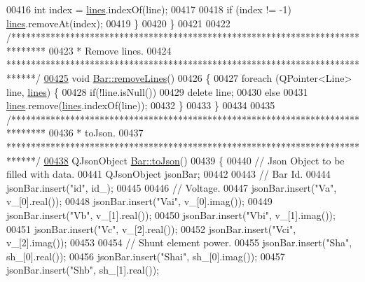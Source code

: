 \begin{DoxyCode}
00416     \textcolor{keywordtype}{int} index = \hyperlink{class_bar_a5aabf1f4ac22e20e9cb702a3a7e08eea}{lines}.indexOf(line);
00417 
00418     \textcolor{keywordflow}{if} (index != -1) \hyperlink{class_bar_a5aabf1f4ac22e20e9cb702a3a7e08eea}{lines}.removeAt(index);
00419   \}
00420 \}
00421 
00422 \textcolor{comment}{/*******************************************************************************}
00423 \textcolor{comment}{ * Remove lines.}
00424 \textcolor{comment}{ ******************************************************************************/}
\hypertarget{bar_8cpp_source_l00425}{}\hyperlink{group___models_ga4ea1a2074cb45968d80d6add571884a4}{00425} \textcolor{keywordtype}{void} \hyperlink{group___models_ga4ea1a2074cb45968d80d6add571884a4}{Bar::removeLines}()
00426 \{
00427   \textcolor{keywordflow}{foreach} (QPointer<Line> line, \hyperlink{class_bar_a5aabf1f4ac22e20e9cb702a3a7e08eea}{lines}) \{
00428     \textcolor{keywordflow}{if}(!line.isNull())
00429       \textcolor{keyword}{delete} line;
00430     \textcolor{keywordflow}{else}
00431       \hyperlink{class_bar_a5aabf1f4ac22e20e9cb702a3a7e08eea}{lines}.remove(\hyperlink{class_bar_a5aabf1f4ac22e20e9cb702a3a7e08eea}{lines}.indexOf(line));
00432   \}
00433 \}
00434 
00435 \textcolor{comment}{/*******************************************************************************}
00436 \textcolor{comment}{ * toJson.}
00437 \textcolor{comment}{ ******************************************************************************/}
\hypertarget{bar_8cpp_source_l00438}{}\hyperlink{group___models_ga3eb84c42b687db6cd98e11b8bd38c86e}{00438} QJsonObject \hyperlink{group___models_ga3eb84c42b687db6cd98e11b8bd38c86e}{Bar::toJson}()
00439 \{
00440   \textcolor{comment}{// Json Object to be filled with data.}
00441   QJsonObject jsonBar;
00442 
00443   \textcolor{comment}{// Bar Id.}
00444   jsonBar.insert(\textcolor{stringliteral}{"id"}, id\_);
00445 
00446   \textcolor{comment}{// Voltage.}
00447   jsonBar.insert(\textcolor{stringliteral}{"Va"}, v\_[0].real());
00448   jsonBar.insert(\textcolor{stringliteral}{"Vai"}, v\_[0].imag());
00449   jsonBar.insert(\textcolor{stringliteral}{"Vb"}, v\_[1].real());
00450   jsonBar.insert(\textcolor{stringliteral}{"Vbi"}, v\_[1].imag());
00451   jsonBar.insert(\textcolor{stringliteral}{"Vc"}, v\_[2].real());
00452   jsonBar.insert(\textcolor{stringliteral}{"Vci"}, v\_[2].imag());
00453 
00454   \textcolor{comment}{// Shunt element power.}
00455   jsonBar.insert(\textcolor{stringliteral}{"Sha"}, sh\_[0].real());
00456   jsonBar.insert(\textcolor{stringliteral}{"Shai"}, sh\_[0].imag());
00457   jsonBar.insert(\textcolor{stringliteral}{"Shb"}, sh\_[1].real());

\end{DoxyCode}
